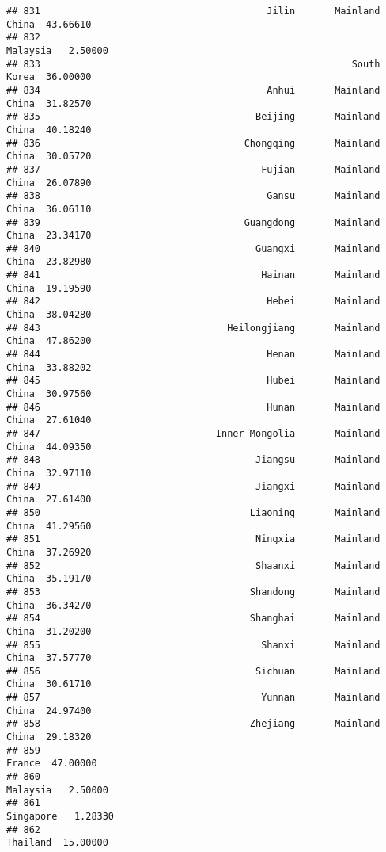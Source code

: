 \documentclass[
]{article}
\begin{document}
\begin{verbatim}
## 831                                        Jilin       Mainland China  43.66610
## 832                                                          Malaysia   2.50000
## 833                                                       South Korea  36.00000
## 834                                        Anhui       Mainland China  31.82570
## 835                                      Beijing       Mainland China  40.18240
## 836                                    Chongqing       Mainland China  30.05720
## 837                                       Fujian       Mainland China  26.07890
## 838                                        Gansu       Mainland China  36.06110
## 839                                    Guangdong       Mainland China  23.34170
## 840                                      Guangxi       Mainland China  23.82980
## 841                                       Hainan       Mainland China  19.19590
## 842                                        Hebei       Mainland China  38.04280
## 843                                 Heilongjiang       Mainland China  47.86200
## 844                                        Henan       Mainland China  33.88202
## 845                                        Hubei       Mainland China  30.97560
## 846                                        Hunan       Mainland China  27.61040
## 847                               Inner Mongolia       Mainland China  44.09350
## 848                                      Jiangsu       Mainland China  32.97110
## 849                                      Jiangxi       Mainland China  27.61400
## 850                                     Liaoning       Mainland China  41.29560
## 851                                      Ningxia       Mainland China  37.26920
## 852                                      Shaanxi       Mainland China  35.19170
## 853                                     Shandong       Mainland China  36.34270
## 854                                     Shanghai       Mainland China  31.20200
## 855                                       Shanxi       Mainland China  37.57770
## 856                                      Sichuan       Mainland China  30.61710
## 857                                       Yunnan       Mainland China  24.97400
## 858                                     Zhejiang       Mainland China  29.18320
## 859                                                            France  47.00000
## 860                                                          Malaysia   2.50000
## 861                                                         Singapore   1.28330
## 862                                                          Thailand  15.00000

\end{verbatim}
\end{document}
